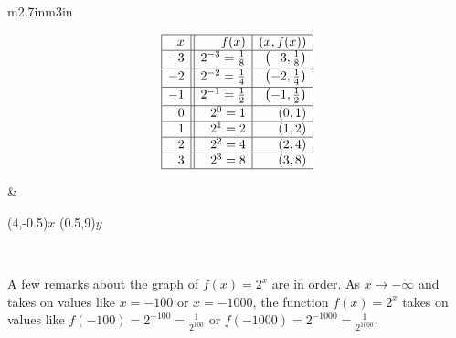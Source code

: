 \hspace{1in} \begin{tabular}{m{2.7in}m{3in}}

\setlength{\extrarowheight}{4pt}
\[ \begin{array}{|r||r|r|}  

\hline

 x & f(x) & (x,f(x)) \\ \hline
-3 & 2^{-3} = \frac{1}{8} & \left(-3, \frac{1}{8} \right) \\ [2pt] \hline
-2 & 2^{-2} = \frac{1}{4} &  \left(-2, \frac{1}{4} \right) \\ [2pt] \hline
-1 & 2^{-1} = \frac{1}{2} &  \left(-1, \frac{1}{2} \right) \\ [2pt]  \hline
0  & 2^{0} = 1 & ( 0 ,1) \\  \hline
1  & 2^{1} = 2 & ( 1, 2) \\  \hline
2  & 2^{2} = 4 & (2,4) \\  \hline
3  & 2^{3} = 8 & (3, 8) \\  \hline
\end{array} \] 
\setlength{\extrarowheight}{2pt}

&

\begin{mfpic}[13]{-4}{4}{-1}{9}

\axes
\tlabel[cc](4,-0.5){\scriptsize $x$}
\tlabel[cc](0.5,9){\scriptsize $y$}
\tlpointsep{4pt}
\penwd{1.25pt}
\arrow \reverse \arrow {}
\end{mfpic} \\

\end{tabular}

A few remarks about the graph of $f(x) = 2^{x}$ are in order.  As $x \rightarrow -\infty$ and takes on values like $x = -100$ or $x=-1000$, the function $f(x) = 2^{x}$ takes on values like $f(-100) = 2^{-100} = \frac{1}{2^{100}}$ or $f(-1000) = 2^{-1000} = \frac{1}{2^{1000}}$.  


